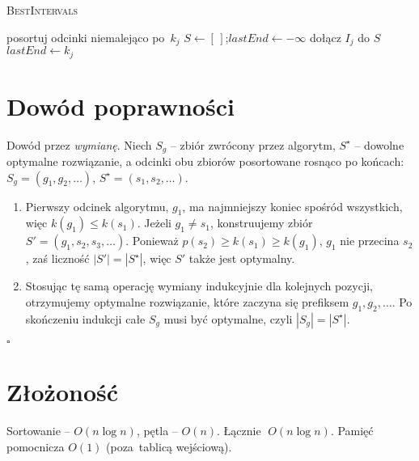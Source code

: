 \documentclass[11pt,a4paper]{article}
\begin{document}
\begin{algorithm}[H]
\caption{\textsc{BestIntervals}}
\begin{algorithmic}[1]
\State posortuj odcinki niemalejąco po~$k_j$
\State $S\gets[\,]$;\quad$lastEnd\gets-\infty$
     \State dołącz $I_j$ do $S$
     \State $lastEnd\gets k_j$
  \EndIf
\EndFor
\State {}
\end{algorithmic}
\end{algorithm}

\section*{Dowód poprawności}

Dowód przez \emph{wymianę}.
Niech $S_g$ – zbiór zwrócony przez algorytm,
$S^\star$ – dowolne optymalne rozwiązanie,
a odcinki obu zbiorów
posortowane rosnąco po końcach:
\(S_g=(g_1,g_2,\dots)\), \(S^\star=(s_1,s_2,\dots)\).

\begin{enumerate}
\item
Pierwszy odcinek algorytmu, $g_1$,
ma najmniejszy koniec spośród wszystkich,
więc $k(g_1)\le k(s_1)$.
Jeżeli $g_1\ne s_1$,
konstruujemy zbiór $S'=(g_1,s_2,s_3,\dots)$.
Ponieważ $p(s_2)\ge k(s_1)\ge k(g_1)$,
$g_1$ nie przecina $s_2$,
zaś liczność $|S'|=|S^\star|$,
więc $S'$ także jest optymalny.

\item
Stosując tę samą operację wymiany
indukcyjnie dla kolejnych pozycji,
otrzymujemy optymalne rozwiązanie,
które zaczyna się prefiksem $g_1,g_2,\dots$.
Po skończeniu indukcji całe $S_g$
musi być optymalne,
czyli $|S_g|=|S^\star|$.
\end{enumerate}
\hfill$\square$

\section*{Złożoność}

Sortowanie – $O(n\log n)$,
pętla – $O(n)$.
Łącznie \(\;O(n\log n)\).
Pamięć pomocnicza \(O(1)\)
(poza~tablicą wejściową).
\end{document}
